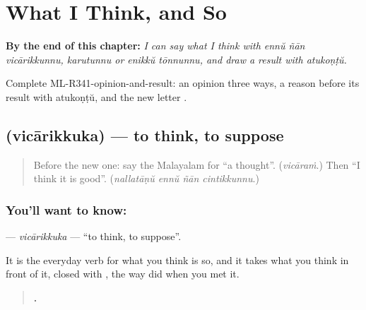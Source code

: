 
\chapter{What I Think, and So}
\label{ch:ml-what-i-think-and-so}

\begin{chapteropening}
\textbf{By the end of this chapter:} \emph{I can say what I think with ennŭ ñān vicārikkunnu, karutunnu or enikkŭ tōnnunnu, and draw a result with atukoṇṭŭ.}

Complete ML-R341-opinion-and-result: an opinion three ways, a reason before its result with atukoṇṭŭ, and the new letter .
\end{chapteropening}

\section[\texorpdfstring{\ml{വിചാരിക്കുക} (vicārikkuka)}{വിചാരിക്കുക (vicārikkuka)}]{ (vicārikkuka) — to think, to suppose}

\label{lesson:ML-C341-vicarikkuka}



\begin{quote}
Before the new one: say the Malayalam for \textquotedblleft{}a thought\textquotedblright{}. (\emph{vicāraṁ}.) Then \textquotedblleft{}I think it is good\textquotedblright{}. (\emph{nallatāṇŭ ennŭ ñān cintikkunnu}.)
\end{quote}

\subsection*{You'll want to know: }
\textbf{} — \emph{vicārikkuka} — \textquotedblleft{}to think, to suppose\textquotedblright{}.

It is the everyday verb for what you think is so, and it takes what you think in front of it, closed with \textbf{}, the way \textbf{} did when you met it.

\begin{quote}
\textbf{      .}
\end{quote}

